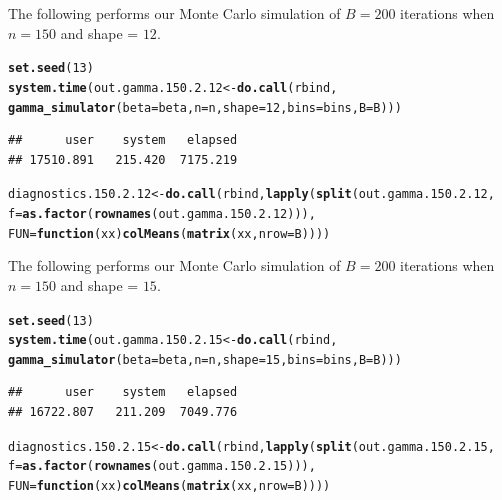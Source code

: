 \documentclass[11pt]{article}\usepackage[]{graphicx}\usepackage[]{color}
\makeatletter
\newcommand{\hlnum}[1]{\textcolor[rgb]{0.686,0.059,0.569}{#1}}%
\newcommand{\hlstd}[1]{\textcolor[rgb]{0.345,0.345,0.345}{#1}}%
\newcommand{\hlkwa}[1]{\textcolor[rgb]{0.161,0.373,0.58}{\textbf{#1}}}%
\newcommand{\hlkwb}[1]{\textcolor[rgb]{0.69,0.353,0.396}{#1}}%
\newcommand{\hlkwc}[1]{\textcolor[rgb]{0.333,0.667,0.333}{#1}}%
\newcommand{\hlkwd}[1]{\textcolor[rgb]{0.737,0.353,0.396}{\textbf{#1}}}%
\newenvironment{kframe}{%
 \def\at@end@of@kframe{}%
 \ifinner\ifhmode%
  \def\at@end@of@kframe{\end{minipage}}%
  \begin{minipage}{\columnwidth}%
 \fi\fi%
 \def\FrameCommand##1{\hskip\@totalleftmargin \hskip-\fboxsep
 \colorbox{shadecolor}{##1}\hskip-\fboxsep
     \hskip-\linewidth \hskip-\@totalleftmargin \hskip\columnwidth}%
 \MakeFramed {\advance\hsize-\width
   \@totalleftmargin\z@ \linewidth\hsize
   \@setminipage}}%
 {\par\unskip\endMakeFramed%
 \at@end@of@kframe}
\newenvironment{knitrout}{}{} %
\makeatother
\begin{document}
The following performs our Monte Carlo simulation of $B = 200$ iterations 
when $n = 150$ and shape = $12$.

\begin{knitrout}
\color{fgcolor}\begin{kframe}
\begin{alltt}
\hlkwd{set.seed}\hlstd{(}\hlnum{13}\hlstd{)}
\hlkwd{system.time}\hlstd{(out.gamma.150.2.12} \hlkwb{<-} \hlkwd{do.call}\hlstd{(rbind,}
  \hlkwd{gamma_simulator}\hlstd{(}\hlkwc{beta} \hlstd{= beta,} \hlkwc{n} \hlstd{= n,} \hlkwc{shape} \hlstd{=} \hlnum{12}\hlstd{,} \hlkwc{bins} \hlstd{= bins,} \hlkwc{B} \hlstd{= B)))}
\end{alltt}
\begin{verbatim}
##      user    system   elapsed 
## 17510.891   215.420  7175.219
\end{verbatim}
\begin{alltt}
\hlstd{diagnostics.150.2.12} \hlkwb{<-} \hlkwd{do.call}\hlstd{(rbind,} \hlkwd{lapply}\hlstd{(}\hlkwd{split}\hlstd{(out.gamma.150.2.12,}
  \hlkwc{f} \hlstd{=} \hlkwd{as.factor}\hlstd{(}\hlkwd{rownames}\hlstd{(out.gamma.150.2.12))),}
  \hlkwc{FUN} \hlstd{=} \hlkwa{function}\hlstd{(}\hlkwc{xx}\hlstd{)} \hlkwd{colMeans}\hlstd{(}\hlkwd{matrix}\hlstd{(xx,} \hlkwc{nrow} \hlstd{= B))))}
\end{alltt}
\end{kframe}
\end{knitrout}




The following performs our Monte Carlo simulation of $B = 200$ iterations 
when $n = 150$ and shape = $15$.

\begin{knitrout}
\color{fgcolor}\begin{kframe}
\begin{alltt}
\hlkwd{set.seed}\hlstd{(}\hlnum{13}\hlstd{)}
\hlkwd{system.time}\hlstd{(out.gamma.150.2.15} \hlkwb{<-} \hlkwd{do.call}\hlstd{(rbind,}
  \hlkwd{gamma_simulator}\hlstd{(}\hlkwc{beta} \hlstd{= beta,} \hlkwc{n} \hlstd{= n,} \hlkwc{shape} \hlstd{=} \hlnum{15}\hlstd{,} \hlkwc{bins} \hlstd{= bins,} \hlkwc{B} \hlstd{= B)))}
\end{alltt}
\begin{verbatim}
##      user    system   elapsed 
## 16722.807   211.209  7049.776
\end{verbatim}
\begin{alltt}
\hlstd{diagnostics.150.2.15} \hlkwb{<-} \hlkwd{do.call}\hlstd{(rbind,} \hlkwd{lapply}\hlstd{(}\hlkwd{split}\hlstd{(out.gamma.150.2.15,}
  \hlkwc{f} \hlstd{=} \hlkwd{as.factor}\hlstd{(}\hlkwd{rownames}\hlstd{(out.gamma.150.2.15))),}
  \hlkwc{FUN} \hlstd{=} \hlkwa{function}\hlstd{(}\hlkwc{xx}\hlstd{)} \hlkwd{colMeans}\hlstd{(}\hlkwd{matrix}\hlstd{(xx,} \hlkwc{nrow} \hlstd{= B))))}
\end{alltt}
\end{kframe}
\end{knitrout}
\end{document}
